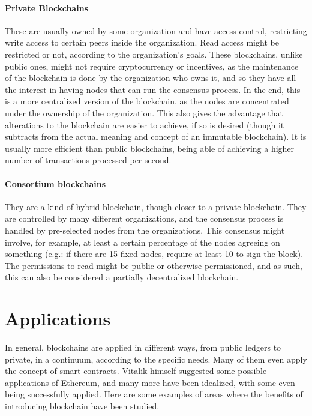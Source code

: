     \paragraph{Private Blockchains} These are usually owned by some organization and have access control, restricting write access to certain peers inside the organization. Read access might be restricted or not, according to the organization's goals. These blockchains, unlike public ones, might not require cryptocurrency or incentives, as the maintenance of the blockchain is done by the organization who owns it, and so they have all the interest in having nodes that can run the consensus process. In the end, this is a more centralized version of the blockchain, as the nodes are concentrated under the ownership of the organization. This also gives the advantage that alterations to the blockchain are easier to achieve, if so is desired (though it subtracts from the actual meaning and concept of an immutable blockchain). It is usually more efficient than public blockchains, being able of achieving a higher number of transactions processed per second.
    
    \paragraph{Consortium blockchains} They are a kind of hybrid blockchain, though closer to a private blockchain. They are controlled by many different organizations, and the consensus process is handled by pre-selected nodes from the organizations. This consensus might involve, for example, at least a certain percentage of the nodes agreeing on something (e.g.: if there are 15 fixed nodes, require at least 10 to sign the block). The permissions to read might be public or otherwise permissioned, and as such, this can also be considered a partially decentralized blockchain.



\section{Applications}

    In general, blockchains are applied in different ways, from public ledgers to private, in a continuum, according to the specific needs. Many of them even apply the concept of smart contracts. Vitalik himself suggested some possible applications of Ethereum, and many more have been idealized, with some even being successfully applied. Here are some examples of areas where the benefits of introducing blockchain have been studied.
    
